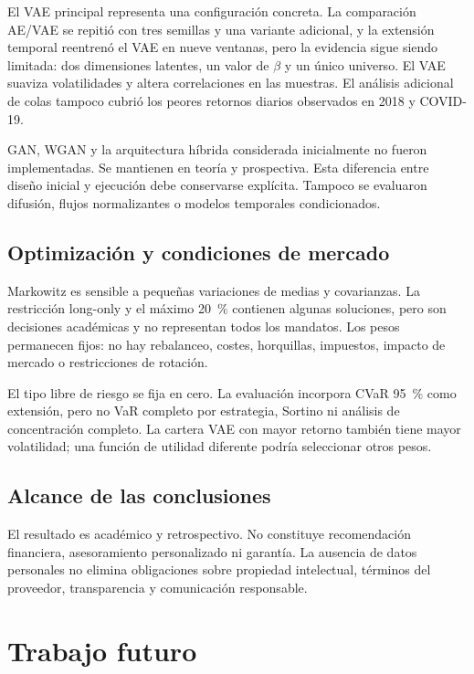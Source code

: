 El VAE principal representa una configuración concreta. La comparación AE/VAE se repitió con tres semillas y una variante adicional, y la extensión temporal reentrenó el VAE en nueve ventanas, pero la evidencia sigue siendo limitada: dos dimensiones latentes, un valor de $\beta$ y un único universo. El VAE suaviza volatilidades y altera correlaciones en las muestras. El análisis adicional de colas tampoco cubrió los peores retornos diarios observados en 2018 y COVID-19.

GAN, WGAN y la arquitectura híbrida considerada inicialmente no fueron implementadas. Se mantienen en teoría y prospectiva. Esta diferencia entre diseño inicial y ejecución debe conservarse explícita. Tampoco se evaluaron difusión, flujos normalizantes o modelos temporales condicionados.

\subsection{Optimización y condiciones de mercado}

Markowitz es sensible a pequeñas variaciones de medias y covarianzas. La restricción long-only y el máximo 20~\% contienen algunas soluciones, pero son decisiones académicas y no representan todos los mandatos. Los pesos permanecen fijos: no hay rebalanceo, costes, horquillas, impuestos, impacto de mercado o restricciones de rotación.

El tipo libre de riesgo se fija en cero. La evaluación incorpora CVaR 95~\% como extensión, pero no VaR completo por estrategia, Sortino ni análisis de concentración completo. La cartera VAE con mayor retorno también tiene mayor volatilidad; una función de utilidad diferente podría seleccionar otros pesos.

\subsection{Alcance de las conclusiones}

El resultado es académico y retrospectivo. No constituye recomendación financiera, asesoramiento personalizado ni garantía. La ausencia de datos personales no elimina obligaciones sobre propiedad intelectual, términos del proveedor, transparencia y comunicación responsable.

\section{Trabajo futuro}

